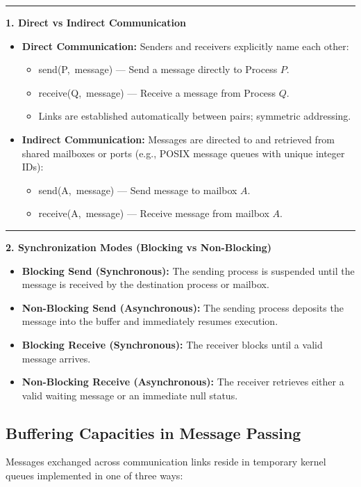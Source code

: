 \documentclass[11pt,a4paper]{article}
\newcommand{\ic}[1]{\mbox{\colorbox{AnthCodeBG}{\footnotesize\ttfamily\textcolor{AnthBlue}{#1}}}}
\newcommand{\concept}[1]{%
  \noindent\textcolor{AnthGreen}{\rule{3pt}{10pt}}\enspace
  \textbf{\color{AnthDark}#1}\par\vspace{2pt}%
}
\begin{document}
\concept{1. Direct vs Indirect Communication}
\begin{itemize}
    \item \textbf{Direct Communication:} Senders and receivers explicitly name each other:
    \begin{itemize}
        \item \ic{send(P, message)} — Send a message directly to Process $P$.
        \item \ic{receive(Q, message)} — Receive a message from Process $Q$.
        \item Links are established automatically between pairs; symmetric addressing.
    \end{itemize}
    \item \textbf{Indirect Communication:} Messages are directed to and retrieved from shared mailboxes or ports (e.g., POSIX message queues with unique integer IDs):
    \begin{itemize}
        \item \ic{send(A, message)} — Send message to mailbox $A$.
        \item \ic{receive(A, message)} — Receive message from mailbox $A$.
    \end{itemize}
\end{itemize}

\concept{2. Synchronization Modes (Blocking vs Non-Blocking)}
\begin{itemize}
    \item \textbf{Blocking Send (Synchronous):} The sending process is suspended until the message is received by the destination process or mailbox.
    \item \textbf{Non-Blocking Send (Asynchronous):} The sending process deposits the message into the buffer and immediately resumes execution.
    \item \textbf{Blocking Receive (Synchronous):} The receiver blocks until a valid message arrives.
    \item \textbf{Non-Blocking Receive (Asynchronous):} The receiver retrieves either a valid waiting message or an immediate null status.
\end{itemize}

\subsection{Buffering Capacities in Message Passing}

Messages exchanged across communication links reside in temporary kernel queues implemented in one of three ways:
\end{document}
